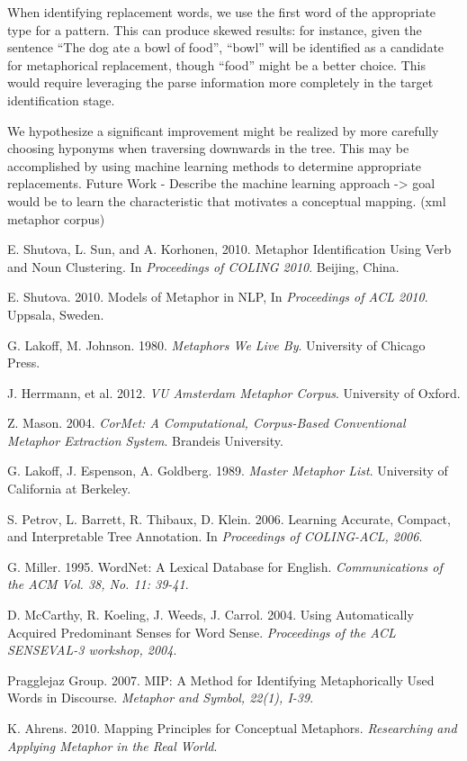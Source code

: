\documentclass[12pt]{article}
\begin{document}
When identifying replacement words, we use the first word of the appropriate type for a pattern.  This can produce skewed results: for instance, given the sentence ``The dog ate a bowl of food'', ``bowl'' will be identified as a candidate for metaphorical replacement, though ``food'' might be a better choice.  This would require leveraging the parse information more completely in the target identification stage.

We hypothesize a significant improvement might be realized by more carefully choosing hyponyms when traversing downwards in the tree.  This may be accomplished by using machine learning methods to determine appropriate replacements.
Future Work - Describe the machine learning approach -> goal would be to learn the characteristic that motivates a conceptual mapping.  (xml metaphor corpus)

\newpage
\begin{thebibliography}{9}

  E. Shutova, L. Sun, and A. Korhonen, 2010.
  Metaphor Identification Using Verb and Noun Clustering.
  In \emph{Proceedings of COLING 2010}.
  Beijing, China.
  
  E. Shutova. 2010.
  Models of Metaphor in NLP,
  In \emph{Proceedings of ACL 2010}.
  Uppsala, Sweden.
  
  G. Lakoff, M. Johnson. 1980.
  \emph{Metaphors We Live By}.
  University of Chicago Press.

  J. Herrmann, et al.  2012.
  \emph{VU Amsterdam Metaphor Corpus}.
  University of Oxford.

  Z. Mason. 2004.
  \emph{CorMet: A Computational, Corpus-Based Conventional Metaphor Extraction System}.
  Brandeis University.

  G. Lakoff, J. Espenson, A. Goldberg. 1989.
  \emph{Master Metaphor List}.
  University of California at Berkeley.
  
  S. Petrov, L. Barrett, R. Thibaux, D. Klein. 2006.
  Learning Accurate, Compact, and Interpretable Tree Annotation.
  In \emph{Proceedings of COLING-ACL, 2006}.

  G. Miller. 1995.
  WordNet: A Lexical Database for English.
  \emph{Communications of the ACM Vol. 38, No. 11: 39-41}.

  D. McCarthy, R. Koeling, J. Weeds, J. Carrol. 2004.
  Using Automatically Acquired Predominant Senses for Word Sense.
  \emph{Proceedings of the ACL SENSEVAL-3 workshop, 2004}.

  Pragglejaz Group. 2007.
  MIP: A Method for Identifying Metaphorically Used Words in Discourse.
  \emph{Metaphor and Symbol, 22(1), I-39}.

  K. Ahrens. 2010.
  Mapping Principles for Conceptual Metaphors.
  \emph{Researching and Applying Metaphor in the Real World}.

\end{thebibliography}
\end{document}
